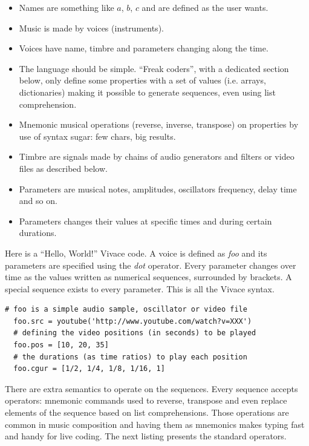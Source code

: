 \documentclass[letterpaper, 12pt]{article}
\begin{document}
\begin{itemize}
  
\item Names are something like $a$, $b$, $c$ and are defined as the user wants.
\item Music is made by voices (instruments).
\item Voices have name, timbre and parameters changing along the
  time.  
\item The language should be simple. ``Freak coders'', with a dedicated section below,
   only define some properties with a set
  of values (i.e. arrays, dictionaries) making it possible to generate
  sequences, even using list comprehension.
\item Mnemonic musical operations (reverse, inverse, transpose)
  on properties by use of syntax sugar: few chars, big
  results.
\item Timbre are signals made by chains of audio generators and
  filters or video files as described below.
\item Parameters are musical notes, amplitudes, oscillators frequency,
  delay time and so on.
\item Parameters changes their values at specific times and during
  certain durations.

\end{itemize}

Here is a ``Hello, World!'' Vivace code. A voice is defined as
\textit{foo} and its parameters are specified using the \textit{dot}
operator. Every parameter changes over time as the values
written as numerical sequences, surrounded by brackets. A special
sequence exists to every parameter.
This is all the Vivace syntax.

\begin{Verbatim}[fontfamily=courier, xleftmargin=\parindent]
  # foo is a simple audio sample, oscillator or video file
  foo.src = youtube('http://www.youtube.com/watch?v=XXX')
  # defining the video positions (in seconds) to be played
  foo.pos = [10, 20, 35]
  # the durations (as time ratios) to play each position
  foo.cgur = [1/2, 1/4, 1/8, 1/16, 1]
\end{Verbatim}

There are extra semantics to operate on the sequences. Every sequence
accepts operators: mnemonic commands used to reverse, transpose and
even replace elements of the sequence based on list
comprehensions. Those operations are common in music composition and
having them as mnemonics makes typing fast and handy for live
coding. The next listing presents the standard operators.
\end{document}
